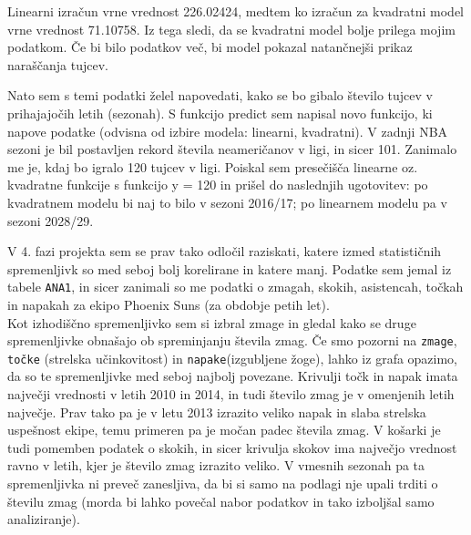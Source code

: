 \documentclass[11pt,a4paper]{article}
\begin{document}
Linearni izračun vrne vrednost 226.02424, medtem ko izračun za kvadratni model vrne vrednost 71.10758. Iz tega sledi, da se kvadratni model bolje prilega mojim podatkom. Če bi bilo podatkov več, bi model pokazal natančnejši prikaz naraščanja tujcev.\\


Nato sem s temi podatki želel napovedati, kako se bo gibalo število tujcev v prihajajočih letih (sezonah). S funkcijo predict sem napisal novo funkcijo, ki napove podatke (odvisna od izbire modela: linearni, kvadratni). V zadnji NBA sezoni je bil postavljen rekord števila neameričanov v ligi, in sicer 101. Zanimalo me je, kdaj bo igralo 120 tujcev v ligi. Poiskal sem presečišča linearne oz. kvadratne funkcije s funkcijo y = 120 in prišel do naslednjih ugotovitev: po kvadratnem modelu bi naj to bilo v sezoni 2016/17;
po linearnem modelu pa v sezoni 2028/29.\\


\newpage
V 4. fazi projekta sem se prav tako odločil raziskati, katere izmed statističnih spremenljivk so med seboj bolj korelirane in katere manj. Podatke sem jemal iz tabele \verb|ANA1|, in sicer zanimali so me podatki o zmagah, skokih, asistencah, točkah in napakah za ekipo Phoenix Suns (za obdobje petih let).\\

\newpage
Kot izhodiščno spremenljivko sem si izbral zmage in gledal kako se druge spremenljivke obnašajo ob spreminjanju števila zmag. Če smo pozorni na \verb|zmage|, \verb|točke| (strelska učinkovitost) in \verb|napake|(izgubljene žoge), lahko iz grafa opazimo, da so te spremenljivke med seboj najbolj povezane. Krivulji točk in napak imata največji vrednosti v letih 2010 in 2014, in tudi število zmag je v omenjenih letih največje. Prav tako pa je v letu 2013 izrazito veliko napak in slaba strelska uspešnost ekipe, temu primeren pa je močan padec števila zmag. V košarki je tudi pomemben podatek o skokih, in sicer krivulja skokov ima največjo vrednost ravno v letih, kjer je število zmag izrazito veliko. V vmesnih sezonah pa ta spremenljivka ni preveč zanesljiva, da bi si samo na podlagi nje upali trditi o številu zmag (morda bi lahko povečal nabor podatkov in tako izboljšal samo analiziranje).\\
\end{document}
